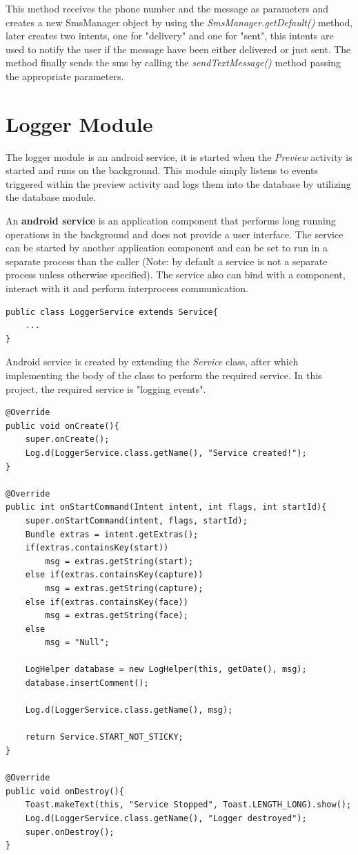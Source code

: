 This method receives the phone number and the message as parameters and creates a new SmsManager object by using the {\it SmsManager.getDefault()} method, later creates two intents, one for "delivery" and one for "sent", this intents are used to notify the user if the message have been either delivered or just sent. The method finally sends the sms by calling the {\it sendTextMessage()} method passing the appropriate parameters.

\section{Logger Module}
The logger module is an android service, it is started when the {\it Preview} activity is started and runs on the background. This module simply listens to events triggered within the preview activity and logs them into the database by utilizing the database module.

An {\bf android service} is an application component that performs long running operations in the background and does not provide a user interface. The service can be started by another application component and can be set to run in a separate process than the caller (Note: by default a service is not a separate process unless otherwise specified). The service also can bind with a component, interact with it and perform interprocess communication.     

\begin{lstlisting}[label=service-logger,caption=Creating android service] 
public class LoggerService extends Service{
	...
}
\end{lstlisting}

Android service is created by extending the {\it Service} class, after which implementing the body of the class to perform the required service. In this project, the required service is "logging events".

\begin{lstlisting}[label=service-logger,caption=Service body implementation] 
@Override
public void onCreate(){
	super.onCreate();
	Log.d(LoggerService.class.getName(), "Service created!");
}
	
@Override
public int onStartCommand(Intent intent, int flags, int startId){
	super.onStartCommand(intent, flags, startId);
	Bundle extras = intent.getExtras();
	if(extras.containsKey(start))
		msg = extras.getString(start);
	else if(extras.containsKey(capture))
		msg = extras.getString(capture);
	else if(extras.containsKey(face))
		msg = extras.getString(face);
	else
		msg = "Null";
		
	LogHelper database = new LogHelper(this, getDate(), msg);
	database.insertComment();
		
	Log.d(LoggerService.class.getName(), msg);
		
	return Service.START_NOT_STICKY;
}
	
@Override
public void onDestroy(){
	Toast.makeText(this, "Service Stopped", Toast.LENGTH_LONG).show();
	Log.d(LoggerService.class.getName(), "Logger destroyed");
	super.onDestroy();	
}
\end{lstlisting}

